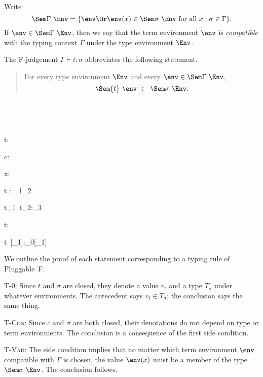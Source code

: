 \documentclass{amsart}
\begin{document}

Write
\[
\Sem\Gamma~\Env =
\{
\env\Or
\env(x)\in\Sem\sigma~\Env\text{ for all }
x:\sigma\in\Gamma
\}.
\]
If $\env\in\Sem\Gamma~\Env$, then we say that the term
environment $\env$ is \emph{compatible} with the typing context
$\Gamma$ under the type environment $\Env$.

The F-judgement $\Gamma\vdash t:\sigma$ abbreviates the
following statement.
\begin{quotation}
For every type environment $\Env$ and every $\env\in\Sem\Gamma~\Env$,
\[
\Sem{t}~\env~\in~\Sem\sigma~\Env.
\]
\end{quotation}~


~

{t:\sigma}

{\Gamma\vdash c:\sigma}

{\Gamma\vdash x:\sigma}

{\Gamma\vdash{}t : \sigma_1\R\sigma_2}

{\Gamma\vdash t_1~t_2:\sigma_3}

{\Gamma\vdash\Tabs\alpha t:\All\alpha\sigma}

{\Gamma\vdash t~[\sigma_1]:\sigma_0[\alpha\mapsto\sigma_1]}



We outline the proof of each statement corresponding to a typing
rule of Pluggable~F.

\textsc{T-0}: Since $t$ and $\sigma$ are closed, they denote a
value $v_t$ and a type $T_\sigma$ under whatever environments.
The antecedent says $v_t\in T_\sigma$; the conclusion says the
same thing.

\textsc{T-Con}: Since $c$ and $\sigma$ are both closed, their
denotations do not depend on type or term environments. The
conclusion is a consequence of the first side condition.

\textsc{T-Var}: The
side condition implies that no matter which term environment
$\env$ compatible with $\Gamma$ is chosen, the value $\env(x)$
must be a member of the type $\Sem\sigma~\Env$. The conclusion
follows.
\end{document}
